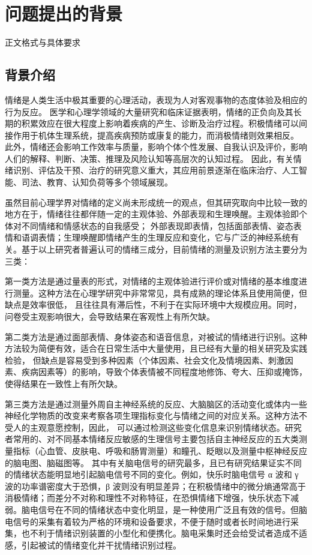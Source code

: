 \section{问题提出的背景}

\par 正文格式与具体要求\cite{zjuthesisrules}

\subsection{背景介绍}
情绪是人类生活中极其重要的心理活动，表现为人对客观事物的态度体验及相应的行为反应。
医学和心理学领域的大量研究和临床证据表明，情绪的正负向及其长期的积累效应在很大程度上影响着疾病的产生、诊断及治疗过程。积极情绪可以间接作用于机体生理系统，提高疾病预防或康复的能力，而消极情绪则效果相反。
此外，情绪还会影响工作效率与质量，影响个体个性发展、自我认识及评价，影响人们的解释、判断、决策、推理及风险认知等高层次的认知过程。
因此，有关情绪识别、评估及干预、治疗的研究意义重大，其应用前景逐渐在临床治疗、人工智能、司法、教育、认知负荷等多个领域展现。

虽然目前心理学界对情绪的定义尚未形成统一的观点，但其研究取向中比较一致的地方在于，情绪往往都伴随一定的主观体验、外部表现和生理唤醒。主观体验即个体对不同情绪和情感状态的自我感受；
外部表现即表情，包括面部表情、姿态表情和语调表情；生理唤醒即情绪产生的生理反应和变化，它与广泛的神经系统有关。基于以上研究者普遍认可的情绪三成分，目前情绪的测量及识别方法主要分为三类：

第一类方法是通过量表的形式，对情绪的主观体验进行评价或对情绪的基本维度进行测量。这种方法在心理学研究中非常常见，具有成熟的理论体系且使用简便，但缺点是效率很低，
且往往具有滞后性，不利于在实际环境中大规模应用。同时，问卷受主观影响很大，会导致结果在客观性上有所欠缺。

第二类方法是通过面部表情、身体姿态和语音信息，对被试的情绪进行识别。这种方法较为简便有效，适合在日常生活中大量使用，且已经有大量的相关研究及实践检验，
但缺点是容易受到多种因素（个体因素、社会文化及情境因素、刺激因素、疾病因素等）的影响，导致个体表情被不同程度地修饰、夸大、压抑或掩饰，使得结果在一致性上有所欠缺。

第三类方法是通过测量外周自主神经系统的反应、大脑脑区的活动变化或体内一些神经化学物质的改变来考察各项生理指标变化与情绪之间的对应关系。这种方法不受人的主观意愿控制，因此，
可以通过检测这些变化信息来识别情绪状态。研究者常用的、对不同基本情绪反应敏感的生理信号主要包括自主神经反应的五大类测量指标（心血管、皮肤电、呼吸和肠胃测量）和瞳孔、眨眼以及测量中枢神经反应的脑电图、脑磁图等。
其中有关脑电信号的研究最多，且已有研究结果证实不同的情绪状态能明显地引起脑电信号不同的变化。例如，快乐时脑电信号 α 波和 γ 波的功率谱密度大于恐惧，β 波则没有明显差异；在积极情绪中的微分熵通常高于消极情绪；而差分不对称和理性不对称特征，在恐惧情绪下增强，快乐状态下减弱。脑电信号在不同的情绪状态中变化明显，是一种使用广泛且有效的信号。但脑电信号的采集有着较为严格的环境和设备要求，不便于随时或者长时间地进行采集，也不利于情绪识别装置的小型化和便携化。脑电采集时还会给受试者造成不适感，引起被试的情绪变化并干扰情绪识别过程。

